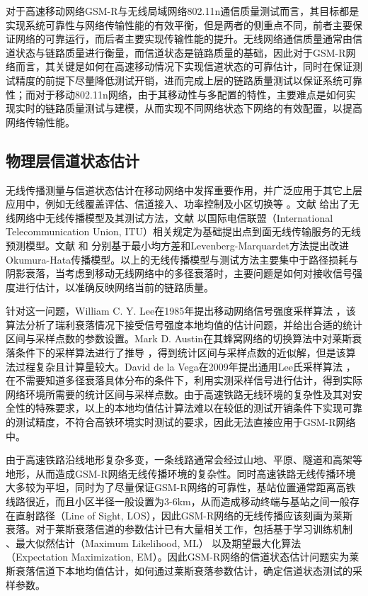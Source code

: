 对于高速移动网络GSM-R与无线局域网络802.11n通信质量测试而言，其目标都是实现系统可靠性与网络传输性能的有效平衡，但是两者的侧重点不同，前者主要保证网络的可靠运行，而后者主要实现传输性能的提升。无线网络通信质量通常由信道状态与链路质量进行衡量，而信道状态是链路质量的基础，因此对于GSM-R网络而言，其关键是如何在高速移动情况下实现信道状态的可靠估计，同时在保证测试精度的前提下尽量降低测试开销，进而完成上层的链路质量测试以保证系统可靠性；而对于移动802.11n网络，由于其移动性与多配置的特性，主要难点是如何实现实时的链路质量测试与建模，从而实现不同网络状态下网络的有效配置，以提高网络传输性能。

\subsection{物理层信道状态估计}
\label{sec:phy}

无线传播测量与信道状态估计在移动网络中发挥重要作用，并广泛应用于其它上层应用中，例如无线覆盖评估、信道接入、功率控制及小区切换等 \cite{Austin1994}\cite{itoh2002performance}\cite{zhang1996analysis}\cite{zhu2005performance}。文献 \cite{andersen1995propagation} \cite{sarkar2003survey} 给出了无线网络中无线传播模型及其测试方法，文献 \cite{Ostlin2008itu} 以国际电信联盟（International Telecommunication Union, ITU）相关规定为基础提出点到面无线传输服务的无线预测模型。文献 \cite{Akhoondzadeh2007modifi} 和 \cite{medeisis2000use} 分别基于最小均方差和Levenberg-Marquardet方法提出改进Okumura-Hata传播模型。以上的无线传播模型与测试方法主要集中于路径损耗与阴影衰落，当考虑到移动无线网络中的多径衰落时，主要问题是如何对接收信号强度进行估计，以准确反映网络当前的链路质量。

针对这一问题，William C. Y. Lee在1985年提出移动网络信号强度采样算法 \cite{lee1985estimate}，该算法分析了瑞利衰落情况下接受信号强度本地均值的估计问题，并给出合适的统计区间与采样点数的参数设置。Mark D. Austin在其蜂窝网络的切换算法中对莱斯衰落条件下的采样算法进行了推导 \cite{Austin1994}，得到统计区间与采样点数的近似解，但是该算法过程复杂且计算量较大。David de la Vega在2009年提出通用Lee氏采样算法 \cite{Vega2009}，在不需要知道多径衰落具体分布的条件下，利用实测采样信号进行估计，得到实际网络环境所需要的统计区间与采样点数。由于高速铁路无线环境的复杂性及其对安全性的特殊要求，以上的本地均值估计算法难以在较低的测试开销条件下实现可靠的测试精度，不符合高铁环境实时测试的要求，因此无法直接应用于GSM-R网络中。

由于高速铁路沿线地形复杂多变，一条线路通常会经过山地、平原、隧道和高架等地形，从而造成GSM-R网络无线传播环境的复杂性。同时高速铁路无线传播环境大多较为平坦，同时为了尽量保证GSM-R网络的可靠性，基站位置通常距离高铁线路很近，而且小区半径一般设置为3-6km，从而造成移动终端与基站之间一般存在直射路径（Line of Sight, LOS），因此GSM-R网络的无线传播应该刻画为莱斯衰落。对于莱斯衰落信道的参数估计已有大量相关工作，包括基于学习训练机制 \cite{bjornson2010framework}、最大似然估计（Maximum Likelihood, ML） \cite{sijbers1998maximum} 以及期望最大化算法（Expectation Maximization, EM）\cite{marzetta1995algorithm}。因此GSM-R网络的信道状态估计问题实为莱斯衰落信道下本地均值估计，如何通过莱斯衰落参数估计，确定信道状态测试的采样参数。

